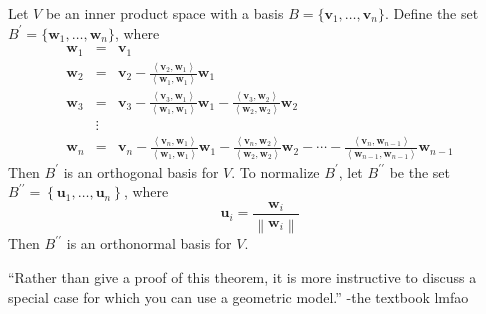 \begin{theorem}\label{gram}
    Let \(V\) be an inner product space with a basis \(B=\{ \mathbf{v}_1,\ldots,\mathbf{v}_n \} \). Define the set \(B^{\prime} =\{ \mathbf{w}_1,\ldots,\mathbf{w}_n \} \), where
    \[
        \begin{array}{ccc}
            \mathbf{w}_1&=&\mathbf{v}_1\\
            \mathbf{w}_2&=&\mathbf{v}_2 -\frac{\left\langle \mathbf{v}_2,\mathbf{w}_1 \right\rangle }{\left\langle \mathbf{w}_1,\mathbf{w}_1 \right\rangle }\mathbf{w}_1\\
            \mathbf{w}_3&=&\mathbf{v}_3 -\frac{\left\langle \mathbf{v}_3,\mathbf{w}_1 \right\rangle }{\left\langle \mathbf{w}_1,\mathbf{w}_1 \right\rangle }\mathbf{w}_1 -\frac{\left\langle \mathbf{v}_3,\mathbf{w}_2 \right\rangle }{\left\langle \mathbf{w}_2,\mathbf{w}_2 \right\rangle }\mathbf{w}_2\\
            &\vdots&\\
            \mathbf{w}_n&=&\mathbf{v}_n -\frac{\left\langle \mathbf{v}_n ,\mathbf{w}_1\right\rangle }{\left\langle \mathbf{w}_1,\mathbf{w}_1 \right\rangle }\mathbf{w}_1 - \frac{\left\langle \mathbf{v}_n,\mathbf{w}_2 \right\rangle }{\left\langle \mathbf{w}_2,\mathbf{w}_2 \right\rangle }\mathbf{w}_2 -\cdots-\frac{\left\langle \mathbf{v}_n,\mathbf{w}_{n-1}  \right\rangle }{\left\langle \mathbf{w}_{n-1},\mathbf{w}_{n-1}   \right\rangle }\mathbf{w}_{n-1} 
        \end{array}
    \]
    Then \(B^{\prime} \) is an orthogonal basis for \(V\). To normalize \(B^{\prime} \), let \(B^{\prime\prime} \) be the set \(B^{\prime\prime} =\left\{ \mathbf{u}_1,\ldots,\mathbf{u}_n \right\} \), where 
    \[
        \mathbf{u}_i =\frac{\mathbf{w}_i}{\left\lVert \mathbf{w}_i \right\rVert }
    \]
    Then \(B^{\prime\prime} \) is an orthonormal basis for \(V\).
\end{theorem}
``Rather than give a proof of this theorem, it is more instructive to discuss a special case for which you can use a geometric model.'' -the textbook lmfao

